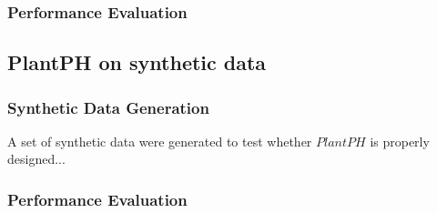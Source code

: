 \documentclass{bioinfo}
\begin{document}
%

%



\subsubsection{Performance Evaluation}





\subsection{PlantPH on synthetic data}

\subsubsection{Synthetic Data Generation}
A set of synthetic data were generated to test whether $PlantPH$ is properly designed...



\subsubsection{Performance Evaluation}




%
%
\end{document}
